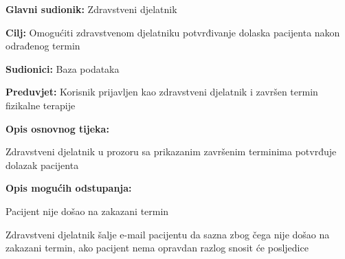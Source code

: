 					\noindent {}
					\begin{packed_item}
						
						\item \textbf{Glavni sudionik: }Zdravstveni djelatnik
						\item  \textbf{Cilj:} Omogućiti zdravstvenom djelatniku potvrđivanje dolaska pacijenta nakon odrađenog termin
						\item  \textbf{Sudionici:} Baza podataka
						\item  \textbf{Preduvjet:} Korisnik prijavljen kao zdravstveni djelatnik i završen termin fizikalne terapije
						\item  \textbf{Opis osnovnog tijeka:}
						
						\item[] \begin{packed_enum}
							
							\item Zdravstveni djelatnik u prozoru sa prikazanim završenim terminima potvrđuje dolazak pacijenta
						\end{packed_enum}
						
						\item  \textbf{Opis mogućih odstupanja:}
						
						\item[] \begin{packed_item}
							
							\item[1.a] Pacijent nije došao na zakazani termin
							\item[] \begin{packed_enum}
								
								\item Zdravstveni djelatnik šalje e-mail pacijentu da sazna zbog čega nije došao na zakazani termin, ako pacijent nema opravdan razlog snosit će posljedice
								
							\end{packed_enum}
						
						\end{packed_item}
						
					\end{packed_item}
					
